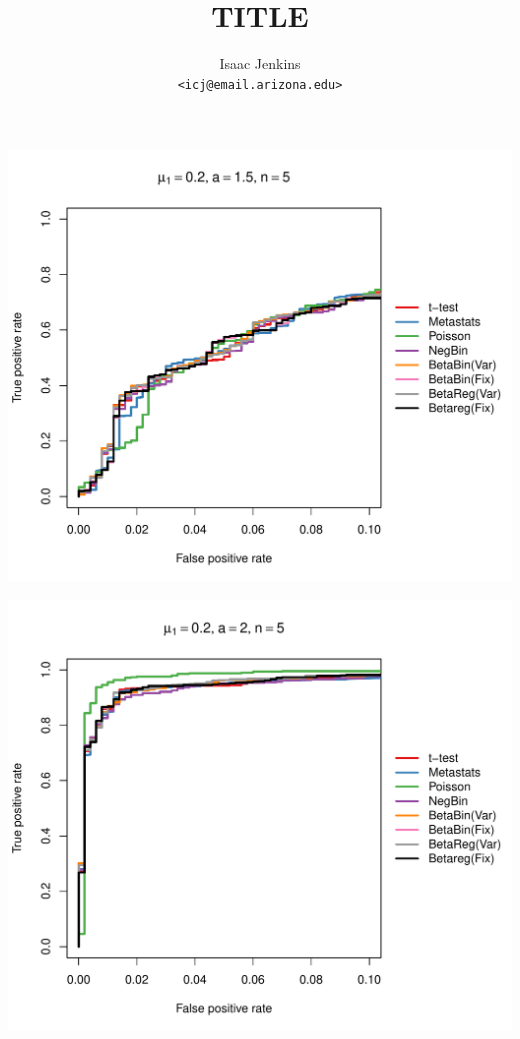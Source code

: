 \documentclass[12pt]{article}\usepackage{graphicx, color}
\title{TITLE}
\author{Isaac Jenkins \\ {\tt <icj@email.arizona.edu>}}
\makeatletter
\def\maxwidth{ %
  \ifdim\Gin@nat@width>\linewidth
    \linewidth
  \else
    \Gin@nat@width
  \fi
}
\newenvironment{knitrout}{}{} %
\makeatother
\begin{document}

\begin{knitrout}
\color{fgcolor}

{\centering \includegraphics[width=\maxwidth]{figure/rocs1} 

}




{\centering \includegraphics[width=\maxwidth]{figure/rocs2} 

}
\end{knitrout}
\end{document}
